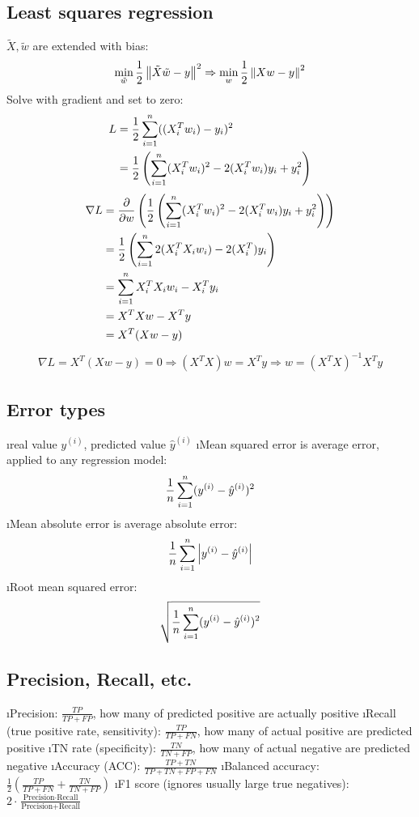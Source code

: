 \subsection{Least squares regression}
$\tilde X, \tilde w$ are extended with bias:
\begin{align*}
\min_{\tilde w} \frac{1}{2} \left\lVert\tilde X \tilde w - y\right\rVert^2 \Rightarrow \min_w \frac{1}{2} \left\lVert Xw-y\right\rVert^2
\end{align*}
Solve with gradient and set to zero:
\begin{align*}
L &= \frac{1}{2} \displaystyle\sum_{i=1}^n ((X_i^Tw_i)-y_i)^2 \\
&= \frac{1}{2} \left(\displaystyle\sum_{i=1}^n (X_i^Tw_i)^2 - 2(X_i^Tw_i)y_i + y_i^2 \right) \\
\end{align*}
\begin{align*}
  \nabla L &= \frac{\partial}{\partial w} \left(  \frac{1}{2} \left(\displaystyle\sum_{i=1}^n (X_i^Tw_i)^2 - 2(X_i^Tw_i)y_i + y_i^2 \right) \right)\\
  &= \frac{1}{2} \left(\displaystyle\sum_{i=1}^n 2(X_i^TX_iw_i) - 2(X_i^T)y_i \right)\\
  &= \displaystyle\sum_{i=1}^n X_i^TX_iw_i - X_i^Ty_i\\
  &= X^TXw - X^Ty\\
  &= X^T(Xw-y)
\end{align*}
\begin{align*}
\nabla L = X^T(Xw-y) = 0 \Rightarrow (X^TX)w = X^Ty \Rightarrow w = (X^TX)^{-1}X^Ty
\end{align*}


\subsection{Error types}

\bi
\i real value $y^{(i)}$, predicted value $\hat y^{(i)}$
\i Mean squared error is average error, applied to any regression model: \[\frac{1}{n} \displaystyle\sum_{i=1}^n (y^{(i)} - \hat y^{(i)})^2\]
\i Mean absolute error is average absolute error: \[\frac{1}{n} \displaystyle\sum_{i=1}^n \left|y^{(i)} - \hat y^{(i)}\right|\]
\i Root mean squared error: \[\sqrt{\frac{1}{n} \displaystyle\sum_{i=1}^n (y^{(i)} - \hat y^{(i)})^2}\]
\ei

\subsection{Precision, Recall, etc.}

\bi
\i Precision: $\frac{TP}{TP + FP}$, how many of predicted positive are actually positive
\i Recall (true positive rate, sensitivity): $\frac{TP}{TP + FN}$, how many of actual positive are predicted positive
\i TN rate (specificity): $\frac{TN}{TN + FP}$, how many of actual negative are predicted negative
\i Accuracy (ACC): $\frac{TP + TN}{TP + TN + FP + FN}$
\i Balanced accuracy: $\frac{1}{2} \left( \frac{TP}{TP + FN} + \frac{TN}{TN + FP} \right)$
\i F1 score (ignores usually large true negatives): $2 \cdot \frac{\text{Precision} \cdot \text{Recall}}{\text{Precision} + \text{Recall}}$ 
\ei

